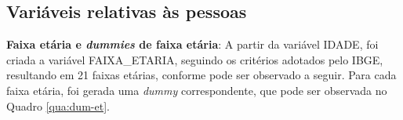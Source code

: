 \newpage
\subsection{Variáveis relativas às pessoas}\label{subsec:novas-var-pess}

\begin{compactitem}

\item \textbf{Faixa etária e \textit{dummies} de faixa etária}: A partir da variável IDADE, foi criada a variável FAIXA_ETARIA, seguindo os critérios adotados pelo IBGE, resultando em 21 faixas etárias, conforme pode ser observado a seguir. Para cada faixa etária, foi gerada uma \textit{dummy} correspondente, que pode ser observada no Quadro \ref{qua:dum-et}.

\begin{quadro}[htb]
\end{quadro}
\end{compactitem}
